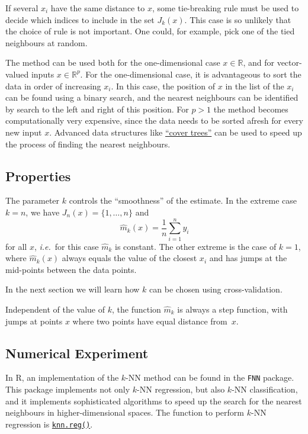 \documentclass[
  a4paper,
]{article}
\theoremstyle{definition}
\theoremstyle{definition}
\theoremstyle{definition}
\theoremstyle{definition}
\theoremstyle{remark}
\begin{document}
If several \(x_i\) have the same distance to \(x\), some tie-breaking rule
must be used to decide which indices to include in the set \(J_k(x)\).
This case is so unlikely that the choice of rule is not important. One
could, for example, pick one of the tied neighbours at random.

The method can be used both for the one-dimensional case \(x\in\mathbb{R}\), and
for vector-valued inputs \(x\in\mathbb{R}^p\). For the one-dimensional case, it is
advantageous to sort the data in order of increasing \(x_i\). In this
case, the position of \(x\) in the list of the \(x_i\) can be found using a
binary search, and the nearest neighbours can be identified by search to
the left and right of this position. For \(p > 1\) the method becomes
computationally very expensive, since the data needs to be sorted afresh
for every new input \(x\). Advanced data structures like \href{https://en.wikipedia.org/wiki/Cover_tree}{``cover trees''} can
be used to speed up the process of finding the nearest neighbours.

\subsection{Properties}\label{properties}

The parameter \(k\) controls the ``smoothness'' of the estimate. In the
extreme case \(k = n\), we have \(J_n(x) = \{1, \ldots, n\}\) and
\begin{equation*}
  \hat m_k(x)
  = \frac1n \sum_{i=1}^n y_i
\end{equation*} for all \(x\), \emph{i.e.}~for this case \(\hat m_k\) is
constant. The other extreme is the case of \(k=1\), where \(\hat m_k(x)\)
always equals the value of the closest \(x_i\) and has jumps at the
mid-points between the data points.

In the next section we will learn how \(k\) can be chosen using
cross-validation.

Independent of the value of \(k\), the function \(\hat m_k\) is always a
step function, with jumps at points \(x\) where two points have equal
distance from~\(x\).

\subsection{Numerical Experiment}\label{numerical-experiment}

In R, an implementation of the \(k\)-NN method can be found in the \texttt{FNN} package.
This package implements not only \(k\)-NN regression, but also \(k\)-NN
classification, and it implements sophisticated algorithms to speed up the
search for the nearest neighbours in higher-dimensional spaces. The function
to perform \(k\)-NN regression is
\href{https://rdrr.io/cran/FNN/man/knn.reg.html}{\texttt{knn.reg()}}.
\end{document}
